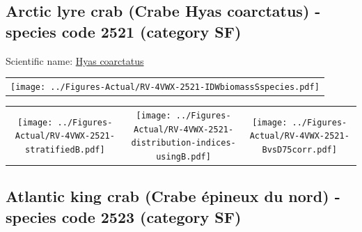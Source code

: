 \documentclass[12pt]{article}\usepackage[]{graphicx}\usepackage[]{color}
\begin{document}
\renewcommand\thefigure{\thesubsection\Alph{figure}}

\setcounter{figure}{0}

\hypertarget{sec:2521}{%
\subsection{Arctic lyre crab (Crabe Hyas coarctatus) - species code 2521 (category SF)}\label{sec:2521}}

  


Scientific name: \href{http://www.marinespecies.org/aphia.php?p=taxdetails\&id=107323}{Hyas coarctatus} \newline
\begin{minipage}{1.0\textwidth}
 \begin{tabular}{c}
\texttt{[image: ../Figures-Actual/RV-4VWX-2521-IDWbiomassSspecies.pdf]} \\ 
\end{tabular} 
\end{minipage}
\newline

\vspace{1cm}
\begin{minipage}{1.0\textwidth}
 \begin{tabular}{ccc}
\texttt{[image: ../Figures-Actual/RV-4VWX-2521-stratifiedB.pdf]} & 
\texttt{[image: ../Figures-Actual/RV-4VWX-2521-distribution-indices-usingB.pdf]} & 
\texttt{[image: ../Figures-Actual/RV-4VWX-2521-BvsD75corr.pdf]} \\ 
\end{tabular} 
\end{minipage}
\clearpage

\renewcommand\thefigure{\thesubsection\Alph{figure}}

\setcounter{figure}{0}

\hypertarget{sec:2523}{%
\subsection{Atlantic king crab (Crabe épineux du nord) - species code 2523 (category SF)}\label{sec:2523}}
\end{document}
